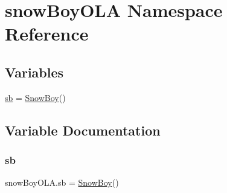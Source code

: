 \hypertarget{namespacesnowBoyOLA}{}\section{snow\+Boy\+O\+LA Namespace Reference}
\label{namespacesnowBoyOLA}
\subsection*{Variables}
\begin{DoxyCompactItemize}
\item 
\hyperlink{namespacesnowBoyOLA_ab93403c888b7d02c5fbea3aa02616143}{sb} = \hyperlink{classvoiceOLA_1_1SnowBoy}{Snow\+Boy}()
\end{DoxyCompactItemize}


\subsection{Variable Documentation}
\mbox{\label{namespacesnowBoyOLA_ab93403c888b7d02c5fbea3aa02616143}} 
\subsubsection{\texorpdfstring{sb}{sb}}
{\footnotesize\ttfamily snow\+Boy\+O\+L\+A.\+sb = \hyperlink{classvoiceOLA_1_1SnowBoy}{Snow\+Boy}()}

